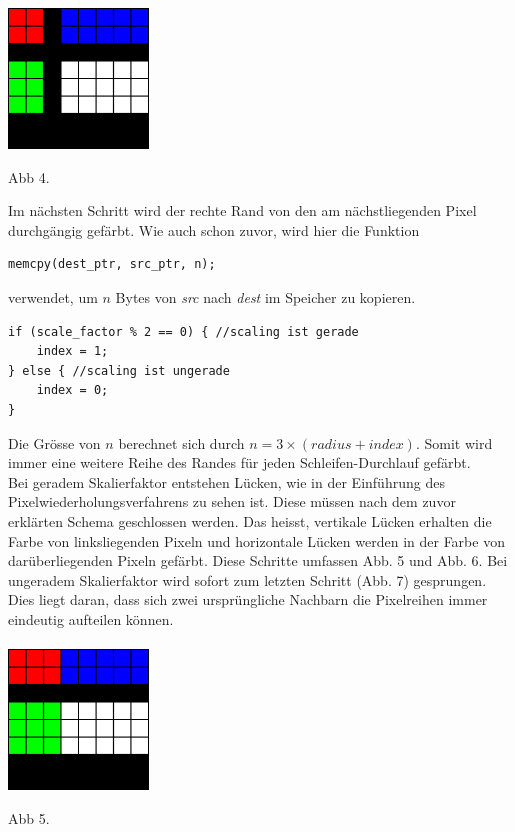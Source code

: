 \documentclass[course=erap]{aspdoc}
\begin{document}
\centering
\includegraphics[width=0.28\textwidth]{"2x2_3"}
\begin{center}
\vspace{-0.5em}
  Abb 4.
\vspace{-0.5em}  
\end{center}
\justify
Im nächsten Schritt wird der rechte Rand von den am nächstliegenden Pixel durchgängig gefärbt. Wie auch schon zuvor, wird hier die Funktion 
\begin{lstlisting}
memcpy(dest_ptr, src_ptr, n);
\end{lstlisting}
verwendet, um $n$ Bytes von {\textit{src}} nach {\textit{dest}} im Speicher zu kopieren. 
\begin{lstlisting}
if (scale_factor % 2 == 0) { //scaling ist gerade
    index = 1;
} else { //scaling ist ungerade
    index = 0;
}
\end{lstlisting}
Die Grösse von $n$ berechnet sich durch $n = 3 \times (radius + index)$. Somit wird immer eine weitere Reihe des Randes für jeden Schleifen-Durchlauf gefärbt.\\
Bei geradem Skalierfaktor entstehen Lücken, wie in der Einführung des Pixelwiederholungsverfahrens zu sehen ist. Diese müssen nach dem zuvor erklärten Schema geschlossen werden. Das heisst, vertikale Lücken erhalten die Farbe von linksliegenden Pixeln und horizontale Lücken werden in der Farbe von darüberliegenden Pixeln gefärbt. Diese Schritte umfassen Abb. 5 und Abb. 6. Bei ungeradem Skalierfaktor wird sofort zum letzten Schritt (Abb. 7) gesprungen. Dies liegt daran, dass sich zwei ursprüngliche Nachbarn die Pixelreihen immer eindeutig aufteilen können.\\\\

\centering
\includegraphics[width=0.28\textwidth]{"2x2_4"}
\begin{center}
\vspace{-0.5em}
  Abb 5.
\vspace{0.5em}  
\end{center}
\justify
\end{document}
